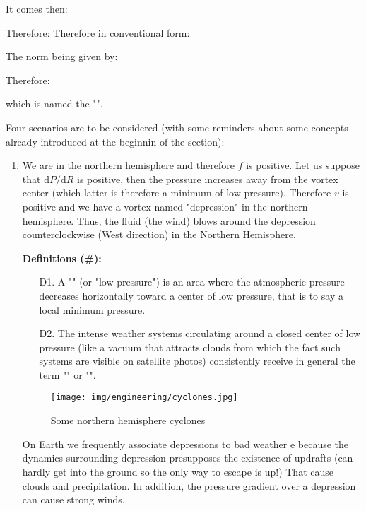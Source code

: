 	It comes then:
	
	Therefore:
	Therefore in conventional form:
	
	The norm being given by:
	
	Therefore:
	
	which is named the "".
	
	Four scenarios are to be considered (with some reminders about some concepts already introduced at the beginnin of the section):
	\begin{enumerate}
		\item We are in the northern hemisphere and therefore $f$ is positive. Let us suppose that $\mathrm{d}P / \mathrm{d}R$ is positive, then the pressure increases away from the vortex center (which latter is therefore a minimum of low pressure). Therefore $v$ is positive and we have a vortex named "depression" in the northern hemisphere. Thus, the fluid (the wind) blows around the depression counterclockwise (West direction) in the Northern Hemisphere.

		\textbf{Definitions (\#\mydef):} 
		\begin{enumerate}
			\item[D1.] A "" (or "low pressure") is an area where the atmospheric pressure decreases horizontally toward a center of low pressure, that is to say a local minimum pressure.
	
			\item[D2.] The intense weather systems circulating around a closed center of low pressure (like a vacuum that attracts clouds from which the fact such systems are visible on satellite photos) consistently receive in  general the term "" or "".
		\end{enumerate}
		\begin{figure}[H]
			\begin{center}
				\texttt{[image: img/engineering/cyclones.jpg]}
			\end{center}	
			\caption[]{Some northern hemisphere cyclones}
		\end{figure}
		\begin{tcolorbox}[title=Remark,colframe=black,arc=10pt]
		On Earth we frequently associate depressions to bad weather e because the dynamics surrounding depression presupposes the existence of updrafts (can hardly get into the ground so the only way to escape is up!) That cause clouds and precipitation. In addition, the pressure gradient over a depression can cause strong winds.
		\end{tcolorbox}
	

\end{enumerate}
